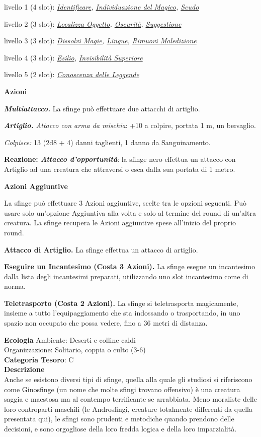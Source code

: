 \begin{multicols}{2}
{livello 1 (4 slot): \emph{\hyperlink{Identificare}{Identificare}, \hyperlink{Individuazione del Magico}{Individuazione del Magico}, \hyperlink{Scudo}{Scudo}}

livello 2 (3 slot): \emph{\hyperlink{Localizza Oggetto}{Localizza Oggetto}, \hyperlink{Oscurità}{Oscurità}, \hyperlink{Suggestione}{Suggestione}}

livello 3 (3 slot): \emph{\hyperlink{Dissolvi Magie}{Dissolvi Magie}, \hyperlink{Lingue}{Lingue}, \hyperlink{Rimuovi Maledizione}{Rimuovi Maledizione}}

livello 4 (3 slot): \emph{\hyperlink{Esilio}{Esilio}, \hyperlink{Invisibilità Superiore}{Invisibilità Superiore}}

livello 5 (2 slot): \emph{\hyperlink{Conoscenza delle Leggende}{Conoscenza delle Leggende}}

\textbf{Azioni}

\emph{\textbf{Multiattacco.}} La sfinge può effettuare due attacchi di artiglio.

\emph{\textbf{Artiglio.} Attacco con arma da mischia}: +10 a colpire, portata 1 m, un bersaglio.

\emph{Colpisce:} 13 (2d8 + 4) danni taglienti, 1 danno da Sanguinamento.

\textbf{Reazione: \emph{Attacco d'opportunità}}: la sfinge nero effettua un attacco con Artiglio ad una creatura che attraversi o esca dalla sua portata di 1 metro.

\textbf{Azioni Aggiuntive}

La sfinge può effettuare 3 Azioni aggiuntive, scelte tra le opzioni seguenti. Può usare solo un'opzione Aggiuntiva alla volta e solo al termine del round di un'altra creatura. La sfinge recupera le Azioni aggiuntive spese all'inizio del proprio round.

\textbf{Attacco di Artiglio.} La sfinge effettua un attacco di artiglio.

\textbf{Eseguire un Incantesimo (Costa 3 Azioni).} La sfinge esegue un incantesimo dalla lista degli incantesimi preparati, utilizzando uno slot incantesimo come di norma.

\textbf{Teletrasporto (Costa 2 Azioni).} La sfinge si teletrasporta magicamente, insieme a tutto l'equipaggiamento che sta indossando o trasportando, in uno spazio non occupato che possa vedere, fino a 36 metri di distanza.

\textbf{Ecologia}
Ambiente: Deserti e colline caldi\\
Organizzazione: Solitario, coppia o culto (3-6)\\
\textbf{Categoria Tesoro}: C\\
\textbf{Descrizione}\\
Anche se esistono diversi tipi di sfinge, quella alla quale gli studiosi si riferiscono come Ginosfinge (un nome che molte sfingi trovano offensivo) è una creatura saggia e maestosa ma al contempo terrificante se arrabbiata. Meno moraliste delle loro controparti maschili (le Androsfingi, creature totalmente differenti da quella presentata qui), le sfingi sono prudenti e metodiche quando prendono delle decisioni, e sono orgogliose della loro fredda logica e della loro imparzialità.

}
\end{multicols}
